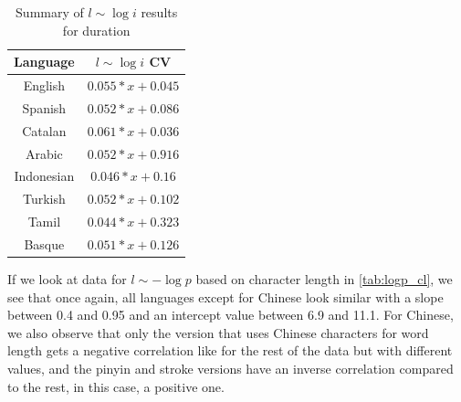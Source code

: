 \begin{table}[H]
    \centering
    \begin{tabular}{c|c}
        Language & $l \sim \log i$ CV \\ \hline
        English & $0.055*x + 0.045$ \\
        Spanish & $0.052*x + 0.086$ \\
        Catalan & $0.061*x + 0.036$ \\
        Arabic & $0.052*x + 0.916$ \\
        Indonesian & $0.046*x + 0.16$ \\
        Turkish & $0.052*x + 0.102$ \\
        Tamil & $0.044*x + 0.323$ \\
        Basque & $0.051*x + 0.126$ \\
    \end{tabular}
    \caption{Summary of $l \sim \log i$ results for duration}
    \label{tab:logi_d}
\end{table}

If we look at data for $l \sim -\log p$ based on character length in \cref{tab:logp_cl}, we see that once again, all languages except for Chinese look similar with a slope between 0.4 and 0.95 and an intercept value between 6.9 and 11.1. For Chinese, we also observe that only the version that uses Chinese characters for word length gets a negative correlation like for the rest of the data but with different values, and the pinyin and stroke versions have an inverse correlation compared to the rest, in this case, a positive one.


